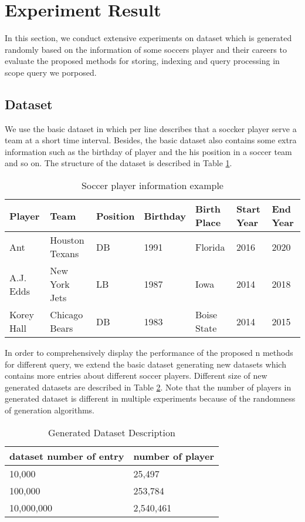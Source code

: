 
\section{Experiment Result}\label{Experiment Result}
In this section, we conduct extensive experiments on dataset which is generated 
randomly based on the information of some soccers player and their careers to 
evaluate the proposed methods for storing, indexing and query processing in scope 
query we porposed.

\subsection{Dataset}
We use the basic dataset in which per line describes that a soccker player serve a team
at a short time interval. Besides, the basic dataset also contains some  extra information 
such as the birthday of player and the his position in a soccer team and so on. The 
structure of the dataset is described in Table \ref{basic_data}.

\begin{table}
	\centering
	\caption{Soccer player information example}
	\label{basic_data}
	\begin{small}
		\begin{tabular}{p{1.6cm}|p{2.5cm}|p{1.2cm}|p{1.3cm}|p{1.7cm}|p{1.5cm}|p{1.5cm}}
			\hline
			Player & Team & Position & Birthday & Birth Place & Start Year & End Year\\ \hline
			Ant & Houston Texans & DB & 1991 & Florida & 2016 & 2020 \\\hline
			A.J. Edds & New York Jets & LB & 1987 & Iowa & 2014 & 2018 \\\hline
			Korey Hall & Chicago Bears & DB & 1983 & Boise State & 2014 & 2015 \\\hline
		\end{tabular}
	\end{small}
\end{table}

In order to comprehensively display the performance of the proposed n methods for different query, 
we extend the basic dataset generating new datasets which contains more entries about different 
soccer players. Different size of new generated datasets are described in Table \ref{gen_data}. Note that 
the number of players in generated dataset is different in multiple experiments because of the randomness 
of generation algorithms.

\begin{table}
	\centering
	\caption{Generated Dataset Description}
	\label{gen_data}
	\begin{small}
		\begin{tabular}{p{4cm}|p{3cm}}
			\hline
			dataset number of entry  & number of player \\\hline
			10,000 & 25,497 \\\hline
			100,000 &  253,784 \\\hline
			10,000,000 & 2,540,461 \\\hline
		\end{tabular}
	\end{small}
\end{table}


